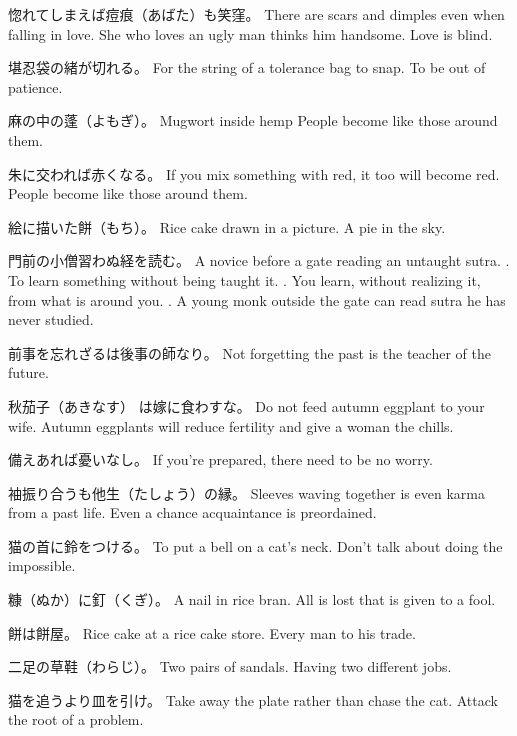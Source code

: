 \par{惚れてしまえば痘痕（あばた）も笑窪。 \hfill\break
There are scars and dimples even when falling in love. \hfill\break
She who loves an ugly man thinks him handsome. \hfill\break
Love is blind. }

\par{堪忍袋の緒が切れる。 \hfill\break
For the string of a tolerance bag to snap. \hfill\break
To be out of patience. }

\par{麻の中の蓬（よもぎ）。 \hfill\break
Mugwort inside hemp \hfill\break
People become like those around them. }

\par{朱に交われば赤くなる。 \hfill\break
If you mix something with red, it too will become red. \hfill\break
People become like those around them. }

\par{絵に描いた餅（もち）。 \hfill\break
Rice cake drawn in a picture. \hfill\break
A pie in the sky. }

\par{門前の小僧習わぬ経を読む。 \hfill\break
A novice before a gate reading an untaught sutra. \hfill{}. To learn something without being taught it. \hfill{}. You learn, without realizing it, from what is around you. \hfill{}. A young monk outside the gate can read sutra he has never studied. }

\par{前事を忘れざるは後事の師なり。 \hfill\break
Not forgetting the past is the teacher of the future. }

\par{秋茄子（あきなす） は嫁に食わすな。 \hfill\break
Do not feed autumn eggplant to your wife. \hfill\break
Autumn eggplants will reduce fertility and give a woman the chills. }

\par{備えあれば憂いなし。 \hfill\break
If you're prepared, there need to be no worry. }

\par{袖振り合うも他生（たしょう）の縁。 \hfill\break
Sleeves waving together is even karma from a past life. \hfill\break
Even a chance acquaintance is preordained. }

\par{猫の首に鈴をつける。 \hfill\break
To put a bell on a cat's neck. \hfill\break
Don't talk about doing the impossible. }

\par{糠（ぬか）に釘（くぎ）。 \hfill\break
A nail in rice bran. \hfill\break
All is lost that is given to a fool. }

\par{餅は餅屋。 \hfill\break
Rice cake at a rice cake store. \hfill\break
Every man to his trade. }

\par{二足の草鞋（わらじ）。 \hfill\break
Two pairs of sandals. \hfill\break
Having two different jobs. }

\par{猫を追うより皿を引け。 \hfill\break
Take away the plate rather than chase the cat. \hfill\break
Attack the root of a problem. }
    